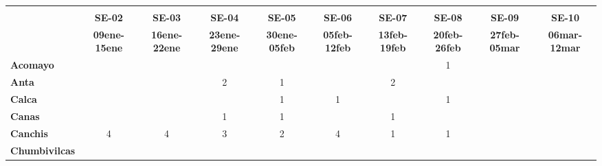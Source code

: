 \begin{tabular}{lccccccccc}
	\textbf{}              & \multicolumn{1}{l}{}                        & \multicolumn{1}{l}{}      & \multicolumn{1}{l}{}                         & \multicolumn{1}{l}{}                         & \multicolumn{1}{l}{}                         & \multicolumn{1}{l}{}                        & \multicolumn{1}{l}{}                         & \multicolumn{1}{l}{}                         & \multicolumn{1}{l}{}     \\
	\textbf{}                                                                               
	&\textbf{SE-02}								&\textbf{SE-03}
	&\textbf{SE-04}								&\textbf{SE-05}	
	&\textbf{SE-06}								&\textbf{SE-07}				&\textbf{SE-08}
	&\textbf{SE-09}								&\textbf{SE-10}\\
	\textbf{}              	  	
	&\textbf{09ene-15ene}						&\textbf{16ene-22ene}				&\textbf{23ene-29ene}						&\textbf{30ene-05feb}
	&\textbf{05feb-12feb}						&\textbf{13feb-19feb}
	&\textbf{20feb-26feb}						&\textbf{27feb-05mar}
	&\textbf{06mar-12mar}\\
	\textbf{Acomayo}                        	
	&\cellcolor[HTML]{FCC46C} 	    			&\cellcolor[HTML]{FCC46C}				    &\cellcolor[HTML]{FCC46C}
	&\cellcolor[HTML]{FCC46C}					&\cellcolor[HTML]{FCC46C}
	&\cellcolor[HTML]{FCC46C}					&1
	&\cellcolor[HTML]{FCC46C}					&\cellcolor[HTML]{FCC46C} \\
	\textbf{Anta}                                                          					
	&\cellcolor[HTML]{FCC46C}					&\cellcolor[HTML]{FCC46C}					&2 				
	&1											&\cellcolor[HTML]{FCC46C}					&2
	&\cellcolor[HTML]{FCC46C}					&\cellcolor[HTML]{FCC46C}					&\cellcolor[HTML]{FCC46C}\\
	\textbf{Calca}      				       								            
	&\cellcolor[HTML]{FCC46C}					&\cellcolor[HTML]{FCC46C}					&\cellcolor[HTML]{FCC46C}
	&1 											&1	
	&\cellcolor[HTML]{FCC46C}					&1											&\cellcolor[HTML]{FCC46C} 				&\cellcolor[HTML]{FCC46C}\\                										
	\textbf{Canas}                              
	&\cellcolor[HTML]{FCC46C} 		
	&\cellcolor[HTML]{FCC46C}					&1
	&1											&\cellcolor[HTML]{FCC46C}
	&1											&\cellcolor[HTML]{FCC46C}
	&\cellcolor[HTML]{FCC46C}					&\cellcolor[HTML]{FCC46C}\\
	\textbf{Canchis}                             		
	&4
	&4											&3
	&2											&4
	&1											&1
	&\cellcolor[HTML]{FCC46C}					&\cellcolor[HTML]{FCC46C}\\
	\textbf{Chumbivilcas}                      			

\end{tabular}
